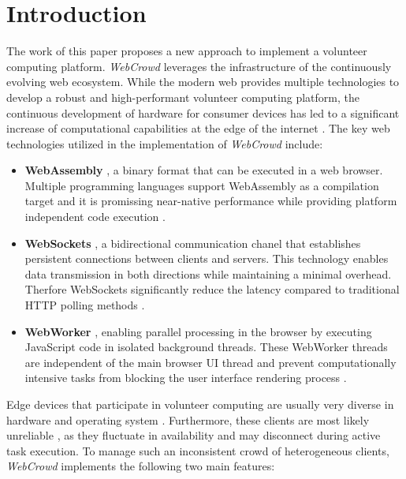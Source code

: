 \chapter{Introduction}
\label{ch:intro}
The work of this paper proposes a new approach to implement a volunteer computing platform. \emph{WebCrowd} leverages the infrastructure of the continuously evolving web ecosystem. While the modern web provides multiple technologies to develop a robust and high-performant volunteer computing platform, the continuous development of hardware for consumer devices has led to a significant increase of computational capabilities at the edge of the internet \cite{relatedwork:mobilecloud, relatedwork:wasmedgecomputing}. The key web technologies utilized in the implementation of \emph{WebCrowd} include:
\begin{itemize}
    \item \textbf{WebAssembly} \cite{methodology:wasmW3C}, a binary format that can be executed in a web browser. Multiple programming languages support WebAssembly as a compilation target and it is promissing near-native performance while providing platform independent code execution \cite{methodology:wasm, methodology:wasmW3C}.
    \item \textbf{WebSockets} \cite{methodology:websockets1}, a bidirectional communication chanel that establishes persistent connections between clients and servers. This technology enables data transmission in both directions while maintaining a minimal overhead. Therfore WebSockets significantly reduce the latency compared to traditional \acs{HTTP} polling methods \cite{methodology:websockets3}. 
    \item \textbf{WebWorker} \cite{methodology:webworkers}, enabling parallel processing in the browser by executing JavaScript code in isolated background threads. These WebWorker threads are independent of the main browser UI thread and prevent computationally intensive tasks from blocking the user interface rendering process \cite{methodology:webworkers}.
\end{itemize}
Edge devices that participate in volunteer computing are usually very diverse in hardware and operating system \cite{intro:diverseDevices}. Furthermore, these clients are most likely unreliable \cite{relatedwork:boinc1}, as they fluctuate in availability and may disconnect during active task execution. To manage such an inconsistent crowd of heterogeneous clients, \emph{WebCrowd} implements the following two main features:
